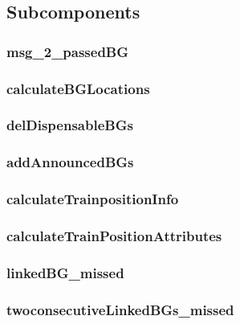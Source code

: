 \subsection{Subcomponents}\label{s:calculateTrainPosition_subcomponents}

\subsubsection{msg\_2\_passedBG}


\subsubsection{calculateBGLocations}


\subsubsection{delDispensableBGs}


\subsubsection{addAnnouncedBGs}


\subsubsection{calculateTrainpositionInfo}


\subsubsection{calculateTrainPositionAttributes}


\subsubsection{linkedBG\_missed}


\subsubsection{twoconsecutiveLinkedBGs\_missed}







